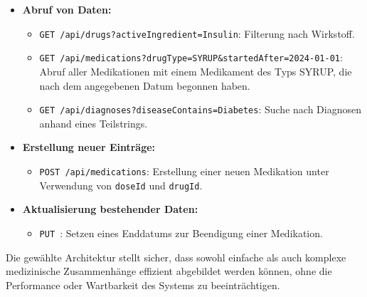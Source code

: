 \begin{itemize}
    \item \textbf{Abruf von Daten:}
    \begin{itemize}
        \item \texttt{GET /api/drugs?activeIngredient=Insulin}: Filterung nach Wirkstoff.
        \item \texttt{GET /api/medications?drugType=SYRUP\&startedAfter=2024-01-01}: Abruf aller Medikationen mit einem Medikament des Typs SYRUP, die nach dem angegebenen Datum begonnen haben.
        \item \texttt{GET /api/diagnoses?diseaseContains=Diabetes}: Suche nach Diagnosen anhand eines Teilstrings.
    \end{itemize}

    \item \textbf{Erstellung neuer Einträge:}
    \begin{itemize}
        \item \texttt{POST /api/medications}: Erstellung einer neuen Medikation unter Verwendung von \texttt{doseId} und \texttt{drugId}.
    \end{itemize}

    \item \textbf{Aktualisierung bestehender Daten:}
    \begin{itemize}
        \item \texttt{PUT }: Setzen eines Enddatums zur Beendigung einer Medikation.
    \end{itemize}
\end{itemize}


Die gewählte Architektur stellt sicher, dass sowohl einfache als auch komplexe medizinische Zusammenhänge effizient abgebildet werden können, ohne die Performance oder Wartbarkeit des Systems zu beeinträchtigen.

